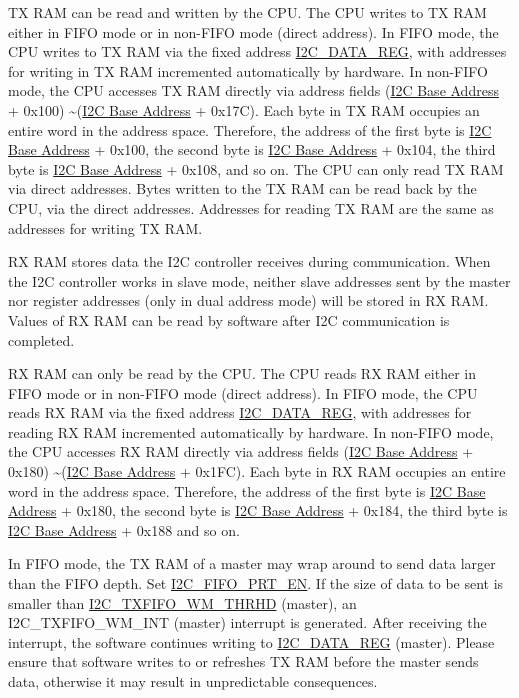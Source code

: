 \documentclass[main\_\_EN.tex]{subfiles}
\begin{document}
TX RAM can be read and written by the CPU. The CPU writes to TX RAM either in FIFO mode or in non-FIFO mode (direct address). In FIFO mode, the CPU writes to TX RAM via the fixed address \hyperref[regdesc:I2CDATAREG]{I2C\_DATA\_REG}, with addresses for writing in TX RAM incremented automatically by hardware. In non-FIFO mode, the CPU accesses TX RAM directly via address fields (\hyperref[tab:sysmem-base-address]{I2C Base Address} + 0x100) \textasciitilde (\hyperref[tab:sysmem-base-address]{I2C Base Address} + 0x17C). Each byte in TX RAM occupies an entire word in the address space. Therefore, the address of the first byte is \hyperref[tab:sysmem-base-address]{I2C Base Address} + 0x100, the second byte is \hyperref[tab:sysmem-base-address]{I2C Base Address} + 0x104, the third byte is \hyperref[tab:sysmem-base-address]{I2C Base Address} + 0x108, and so on. The CPU can only read TX RAM via direct addresses. Bytes written to the TX RAM can be read back by the CPU, via the direct addresses. Addresses for reading TX RAM are the same as addresses for writing TX RAM.

RX RAM stores data the I2C controller receives during communication. When the I2C controller works in slave mode, neither slave addresses sent by the master nor register addresses (only in dual address mode) will be stored in RX RAM. Values of RX RAM can be read by software after I2C communication is completed.

RX RAM can only be read by the CPU. The CPU reads RX RAM either in FIFO mode or in non-FIFO mode (direct address). In FIFO mode, the CPU reads RX RAM via the fixed address \hyperref[regdesc:I2CDATAREG]{I2C\_DATA\_REG}, with addresses for reading RX RAM incremented automatically by hardware. In non-FIFO mode, the CPU accesses RX RAM directly via address fields (\hyperref[tab:sysmem-base-address]{I2C Base Address} + 0x180) \textasciitilde (\hyperref[tab:sysmem-base-address]{I2C Base Address} + 0x1FC). Each byte in RX RAM occupies an entire word in the address space. Therefore, the address of the first byte is \hyperref[tab:sysmem-base-address]{I2C Base Address} + 0x180, the second byte is \hyperref[tab:sysmem-base-address]{I2C Base Address} + 0x184, the third byte is \hyperref[tab:sysmem-base-address]{I2C Base Address} + 0x188 and so on.

In FIFO mode, the TX RAM of a master may wrap around to send data larger than the FIFO depth. Set \hyperref[fielddesc:I2CFIFOPRTEN]{I2C\_FIFO\_PRT\_EN}. If the size of data to be sent is smaller than \hyperref[fielddesc:I2CTXFIFOWMTHRHD]{I2C\_TXFIFO\_WM\_THRHD} (master), an I2C\_TXFIFO\_WM\_INT (master) interrupt is generated. After receiving the interrupt, the software continues writing to \hyperref[regdesc:I2CDATAREG]{I2C\_DATA\_REG} (master). Please ensure that software writes to or refreshes TX RAM before the master sends data, otherwise it may result in unpredictable consequences.
\end{document}

